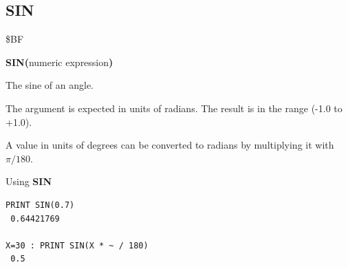 \subsection{SIN}
\begin{description}[leftmargin=2cm,style=nextline]
\item [Token:]    \$BF

\item [Format:]   {\bf SIN(}numeric expression{\bf)}

\item [Returns:]  The sine of an angle.

                  The argument is expected in units of radians. The result is in the range (-1.0 to +1.0).

\item [Remarks:]  A value in units of degrees can be converted to radians by multiplying it with $\pi/180$.

\item [Examples:] Using {\bf SIN}

\begin{tcolorbox}[colback=black,coltext=white]
\verbatimfont{\codefont}
\begin{verbatim}
PRINT SIN(0.7)
 0.64421769

X=30 : PRINT SIN(X * ~ / 180)
 0.5
\end{verbatim}
\end{tcolorbox}
\end{description}


\newpage
